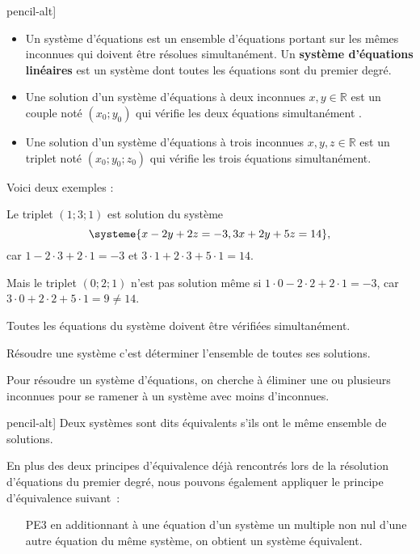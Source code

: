 \documentclass[a4paper,12pt]{report}
\begin{document}
\begin{boiteicone}[][][\faIcon[light]{pencil-alt}]
	\begin{itemize}
		\item Un système d'équations est un ensemble d'équations portant sur les mêmes inconnues qui doivent être résolues simultanément. Un {\bfseries système d'équations linéaires} est un système dont toutes les équations sont du premier degré.
		\item Une solution d'un système d'équations à deux inconnues $x,y\in \mathbb{R}$ est un couple noté $(x_0 ; y_0)$ qui vérifie les deux équations simultanément .
\item Une solution d'un système d'équations à trois inconnues $x , y , z\in \mathbb{R}$ est un triplet noté $(x_0 ; y_0 ; z_0)$ qui vérifie les trois équations simultanément.
	\end{itemize}
\end{boiteicone}

Voici deux exemples : 

Le triplet $(1;3;1)$ est solution du système
\[\systeme{
  x - 2y + 2z = -3,
  3x + 2y + 5z = 14
},\] car $1-2\cdot 3+2\cdot 1=-3$ et $3\cdot 1+2\cdot 3+5\cdot 1 =14$.

Mais le triplet $(0;2;1)$ n'est pas solution même si $1\cdot 0-2\cdot 2+2\cdot 1=-3$, car $3\cdot 0+2\cdot 2+5\cdot 1=9\neq 14$. 

\begin{boiteicone}
Toutes les équations du système doivent être vérifiées simultanément. 
\end{boiteicone}

Résoudre une système c'est déterminer l'ensemble de toutes ses solutions. 

Pour résoudre un système d'équations, on cherche à \og{}éliminer une ou plusieurs inconnues\fg{} pour se ramener à un système avec moins d'inconnues.


\begin{boiteicone}[][][\faIcon[light]{pencil-alt}]
Deux systèmes sont dits équivalents s'ils ont le même ensemble de solutions.
\end{boiteicone}

En plus des deux principes d'équivalence déjà rencontrés lors de la résolution d'équations du premier degré, nous pouvons également appliquer le principe d'équivalence suivant~:
\begin{enumerate}
	\item[PE3] en additionnant à une équation d'un système un multiple non nul d'une autre équation du même système, on obtient un système équivalent.
\end{enumerate}

\begin{boiteExT}[$\systeme{3x+y=4,-2x+3y=10}$]
\vspace{7cm}
\end{boiteExT}
\end{document}
